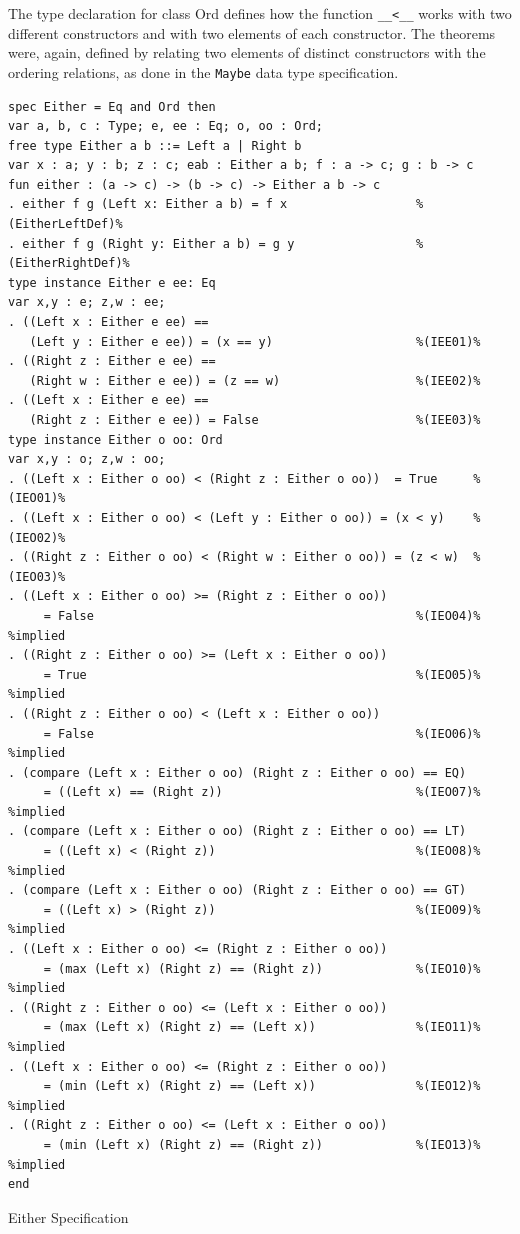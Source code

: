 \documentclass[12pt,twoside]{article}
\numberwithin{spec}{subsection}
\numberwithin{proof}{subsection}
\numberwithin{figure}{subsection}
\numberwithin{code}{subsection}
\begin{document}
The type declaration for class Ord defines how the function \verb.__<__. works with two different constructors and with two elements of each constructor. The theorems were, again, defined by relating two elements of distinct constructors with the ordering relations, as done in the \verb.Maybe. data type specification.

\begin{spec}\capstart
\begin{verbatim}
spec Either = Eq and Ord then
var a, b, c : Type; e, ee : Eq; o, oo : Ord;
free type Either a b ::= Left a | Right b     
var x : a; y : b; z : c; eab : Either a b; f : a -> c; g : b -> c
fun either : (a -> c) -> (b -> c) -> Either a b -> c
. either f g (Left x: Either a b) = f x                  %(EitherLeftDef)%
. either f g (Right y: Either a b) = g y                 %(EitherRightDef)%
type instance Either e ee: Eq
var x,y : e; z,w : ee;
. ((Left x : Either e ee) == 
   (Left y : Either e ee)) = (x == y)                    %(IEE01)%
. ((Right z : Either e ee) ==
   (Right w : Either e ee)) = (z == w)                   %(IEE02)%
. ((Left x : Either e ee) ==
   (Right z : Either e ee)) = False                      %(IEE03)%
type instance Either o oo: Ord
var x,y : o; z,w : oo;
. ((Left x : Either o oo) < (Right z : Either o oo))  = True     %(IEO01)%
. ((Left x : Either o oo) < (Left y : Either o oo)) = (x < y)    %(IEO02)%
. ((Right z : Either o oo) < (Right w : Either o oo)) = (z < w)  %(IEO03)%
. ((Left x : Either o oo) >= (Right z : Either o oo))
     = False                                             %(IEO04)% %implied
. ((Right z : Either o oo) >= (Left x : Either o oo))
     = True                                              %(IEO05)% %implied
. ((Right z : Either o oo) < (Left x : Either o oo))
     = False                                             %(IEO06)% %implied
. (compare (Left x : Either o oo) (Right z : Either o oo) == EQ)
     = ((Left x) == (Right z))                           %(IEO07)% %implied
. (compare (Left x : Either o oo) (Right z : Either o oo) == LT)
     = ((Left x) < (Right z))                            %(IEO08)% %implied
. (compare (Left x : Either o oo) (Right z : Either o oo) == GT)
     = ((Left x) > (Right z))                            %(IEO09)% %implied
. ((Left x : Either o oo) <= (Right z : Either o oo))
     = (max (Left x) (Right z) == (Right z))             %(IEO10)% %implied
. ((Right z : Either o oo) <= (Left x : Either o oo))
     = (max (Left x) (Right z) == (Left x))              %(IEO11)% %implied
. ((Left x : Either o oo) <= (Right z : Either o oo))
     = (min (Left x) (Right z) == (Left x))              %(IEO12)% %implied
. ((Right z : Either o oo) <= (Left x : Either o oo))
     = (min (Left x) (Right z) == (Right z))             %(IEO13)% %implied
end
\end{verbatim}
\caption{Either Specification}
\label{spec:Either}
\end{spec}
\end{document}
